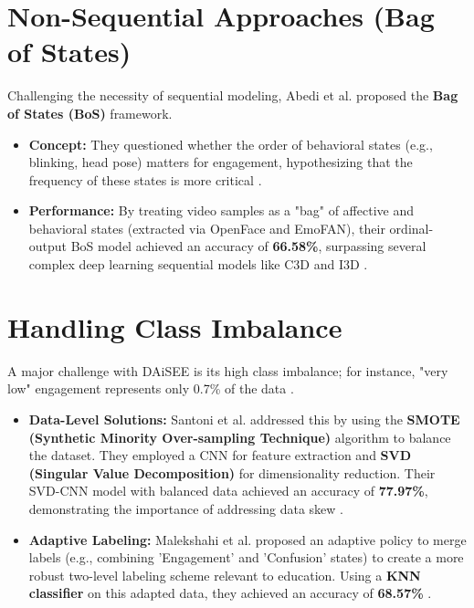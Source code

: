 \section{Non-Sequential Approaches (Bag of States)}
\label{sec:non-sequential-approaches}

Challenging the necessity of sequential modeling, Abedi et al. proposed the \textbf{Bag of States (BoS)} framework.
\begin{itemize}
  \item{\textbf{Concept:} They questioned whether the order of behavioral states (e.g., blinking, head pose) matters for engagement, hypothesizing that the frequency of these states is more critical \cite{Abedi2023BagOS}.}
  \item{\textbf{Performance:} By treating video samples as a "bag" of affective and behavioral states (extracted via OpenFace and EmoFAN), their ordinal-output BoS model achieved an accuracy of \textbf{66.58\%}, surpassing several complex deep learning sequential models like C3D and I3D \cite{Abedi2023BagOS}.}
\end{itemize}

\section{Handling Class Imbalance}
\label{sec:handling-class-imbalance}

A major challenge with DAiSEE is its high class imbalance; for instance, "very low" engagement represents only 0.7\% of the data \cite{Santoni2023ConvolutionalNN}.
\begin{itemize}
  \item{\textbf{Data-Level Solutions:} Santoni et al. addressed this by using the \textbf{SMOTE (Synthetic Minority Over-sampling Technique)} algorithm to balance the dataset. They employed a CNN for feature extraction and \textbf{SVD (Singular Value Decomposition)} for dimensionality reduction. Their SVD-CNN model with balanced data achieved an accuracy of \textbf{77.97\%}, demonstrating the importance of addressing data skew \cite{Santoni2023ConvolutionalNN}.}
  \item{\textbf{Adaptive Labeling:} Malekshahi et al. proposed an adaptive policy to merge labels (e.g., combining 'Engagement' and 'Confusion' states) to create a more robust two-level labeling scheme relevant to education. Using a \textbf{KNN classifier} on this adapted data, they achieved an accuracy of \textbf{68.57\%}} \cite{Malekshahi2024AGM}.
\end{itemize}


